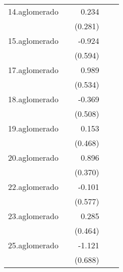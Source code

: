 {\begin{longtable}{l*{4}{D{.}{.}{-1}}}
\addlinespace
14.aglomerado&                     &       0.234         &                     &                     \\
            &                     &     (0.281)         &                     &                     \\
\addlinespace
15.aglomerado&                     &      -0.924         &                     &                     \\
            &                     &     (0.594)         &                     &                     \\
\addlinespace
17.aglomerado&                     &       0.989         &                     &                     \\
            &                     &     (0.534)         &                     &                     \\
\addlinespace
18.aglomerado&                     &      -0.369         &                     &                     \\
            &                     &     (0.508)         &                     &                     \\
\addlinespace
19.aglomerado&                     &       0.153         &                     &                     \\
            &                     &     (0.468)         &                     &                     \\
\addlinespace
20.aglomerado&                     &       0.896\sym{*}  &                     &                     \\
            &                     &     (0.370)         &                     &                     \\
\addlinespace
22.aglomerado&                     &      -0.101         &                     &                     \\
            &                     &     (0.577)         &                     &                     \\
\addlinespace
23.aglomerado&                     &       0.285         &                     &                     \\
            &                     &     (0.464)         &                     &                     \\
\addlinespace
25.aglomerado&                     &      -1.121         &                     &                     \\
            &                     &     (0.688)         &                     &                     \\

\end{longtable}}
